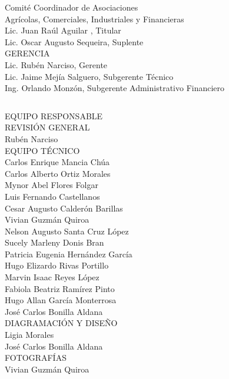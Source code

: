 \documentclass[12pt,letterpaper,twoside]{book}
\let\origdoublepage\cleardoublepage
\newcommand{\clearemptydoublepage}{
  		\clearpage
  		{\pagestyle{empty}\origdoublepage}}
\let\cleardoublepage\clearemptydoublepage
\begin{document}
{\begin{center}
{\Bold Comité Coordinador de Asociaciones\\ Agrícolas, Comerciales, Industriales y Financieras}\\
Lic. Juan Raúl Aguilar , Titular\\
Lic. Oscar Augusto Sequeira, Suplente\\[0.8cm]


{\Bold \large \color{color1!89!black} GERENCIA}\\[0.2cm]
Lic. Rubén Narciso, Gerente\\
Lic. Jaime Mejía Salguero, Subgerente Técnico\\
Ing. Orlando Monzón, Subgerente Administrativo Financiero\\


\end{center}
}
\clearpage

$\ $
\vspace{1cm}

\begin{center}
{\Bold \LARGE EQUIPO RESPONSABLE}\\[2cm]

{\Bold \large \color{color1!89!black} REVISIÓN GENERAL}\\[0.2cm]
Rubén Narciso\\[0.8cm]


{\Bold \large \color{color1!89!black} EQUIPO TÉCNICO}\\[0.2cm]
Carlos Enrique Mancia Chúa\\
Carlos Alberto Ortiz Morales\\
Mynor Abel Flores Folgar\\
Luis Fernando Castellanos\\
Cesar Augusto Calderón Barillas\\
Vivian Guzmán Quiroa\\
Nelson Augusto Santa Cruz López\\
Sucely Marleny Donis Bran\\
Patricia Eugenia Hernández García\\
Hugo Elizardo Rivas Portillo\\
Marvin Isaac Reyes López\\
Fabiola Beatriz Ramírez Pinto\\
Hugo Allan García Monterrosa\\
José Carlos Bonilla Aldana\\[0.8cm]

{\Bold \large \color{color1!89!black} DIAGRAMACIÓN Y DISEÑO}\\[0.2cm]
Ligia Morales\\
José Carlos Bonilla Aldana\\[0.8cm]

{\Bold \large \color{color1!89!black} FOTOGRAFÍAS}\\[0.2cm]
Vivian Guzmán Quiroa\\[0.8cm]



\end{center}\setcounter{page}{0}\cleardoublepage
\end{document}
